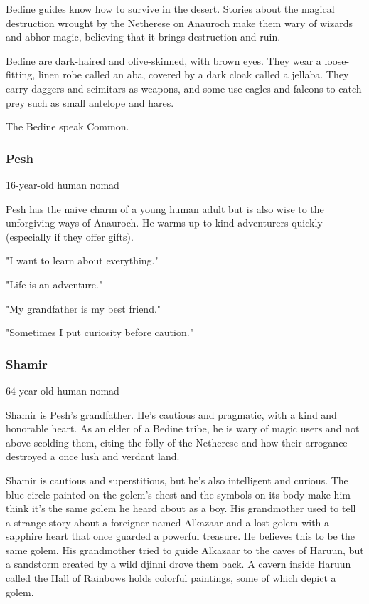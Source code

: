 \documentclass[10pt,a4paper,twoside,bg=print,twocolumn,openany,nodeprecatedcode]{dndbook}
\begin{document}
Bedine guides know how to survive in the desert. Stories about the magical destruction wrought by the Netherese on Anauroch make them wary of wizards and abhor magic, believing that it brings destruction and ruin.

Bedine are dark-haired and olive-skinned, with brown eyes. They wear a loose-fitting, linen robe called an aba, covered by a dark cloak called a jellaba. They carry daggers and scimitars as weapons, and some use eagles and falcons to catch prey such as small antelope and hares.

The Bedine speak Common.

\subsubsection{Pesh}
16-year-old human nomad

Pesh has the naive charm of a young human adult but is also wise to the unforgiving ways of Anauroch. He warms up to kind adventurers quickly (especially if they offer gifts).


\begin{description}[nolistsep]
\item[Personality Trait]
"I want to learn about everything."
\item[Ideal]
"Life is an adventure."
\item[Bond]
"My grandfather is my best friend."
\item[Flaw]
"Sometimes I put curiosity before caution."
\end{description}

\subsubsection{Shamir}
64-year-old human nomad

Shamir is Pesh's grandfather. He's cautious and pragmatic, with a kind and honorable heart. As an elder of a Bedine tribe, he is wary of magic users and not above scolding them, citing the folly of the Netherese and how their arrogance destroyed a once lush and verdant land.

Shamir is cautious and superstitious, but he's also intelligent and curious. The blue circle painted on the golem's chest and the symbols on its body make him think it's the same golem he heard about as a boy. His grandmother used to tell a strange story about a foreigner named Alkazaar and a lost golem with a sapphire heart that once guarded a powerful treasure. He believes this to be the same golem. His grandmother tried to guide Alkazaar to the caves of Haruun, but a sandstorm created by a wild djinni drove them back. A cavern inside Haruun called the Hall of Rainbows holds colorful paintings, some of which depict a golem.
\end{document}
